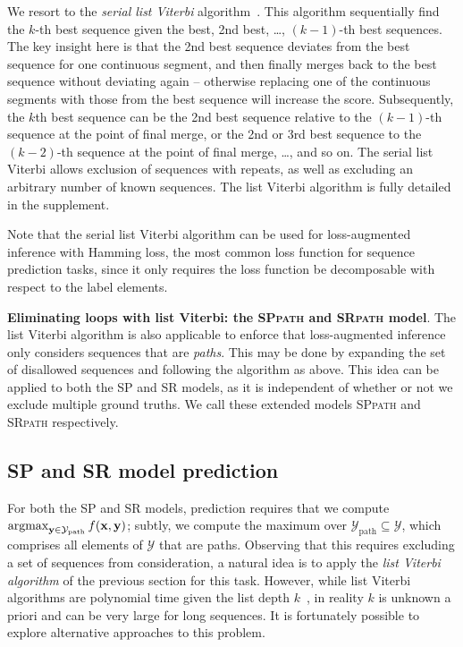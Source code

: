 We resort to the \emph{serial list Viterbi} algorithm~\cite{seshadri1994list,nilsson2001sequentially}.
This algorithm sequentially find the $k$-th best sequence given the best, 2nd best, \dots, $(k \!-\! 1)$-th best sequences.
The key insight here is that the 2nd best sequence deviates from the best sequence
for one continuous segment, and then finally merges back to the best sequence without deviating again
-- otherwise replacing one of the continuous segments with those from the best sequence will increase the score.
Subsequently, the $k$th best sequence can be the 2nd best sequence relative to the $(k \!-\! 1)$-th sequence
at the point of final merge, or the 2nd or 3rd best sequence to the $(k \!-\! 2)$-th sequence at the point of final merge, \ldots, and so on.
The serial list Viterbi allows exclusion of sequences with repeats,
as well as
excluding an arbitrary number of known sequences.
The list Viterbi algorithm is fully detailed in the supplement.

Note that the serial list Viterbi algorithm
can be used for loss-augmented inference with Hamming loss, the most common loss function for sequence prediction tasks,
since it only requires the loss function be decomposable with respect to the label elements.

%
\textbf{Eliminating loops with list Viterbi: the \textsc{SPpath} and \textsc{SRpath} model}.
The list Viterbi algorithm is also applicable to enforce that loss-augmented inference only considers sequences that are \emph{paths}.
This may be done by expanding the set of disallowed sequences and following the algorithm as above.
This idea can be applied to both the SP and SR models, as it is independent of whether or not we exclude multiple ground truths.
We call these extended models \textsc{SPpath} and \textsc{SRpath} respectively.


%
\subsection{SP and SR model prediction}
\label{ssec:testing}

For both the SP and SR models, prediction requires that we compute $\operatorname*{argmax}_{\mathbf{y} \in \mathcal{Y}_{\mathrm{path}}} f( \mathbf{x}, \mathbf{y} )$;
subtly, we compute the maximum over $\mathcal{Y}_{\mathrm{path}} \subseteq \mathcal{Y}$, which comprises all elements of $\mathcal{Y}$ that are {paths}.
Observing that this requires excluding a set of sequences from consideration, a natural idea is to apply the \emph{list Viterbi algorithm} of the previous section for this task.
However, while list Viterbi algorithms are polynomial time given the list depth $k$~\cite{nilsson2001sequentially},
in reality $k$ is unknown a priori and can be very large for long sequences.
It is fortunately possible to explore %
alternative
approaches to this problem.

